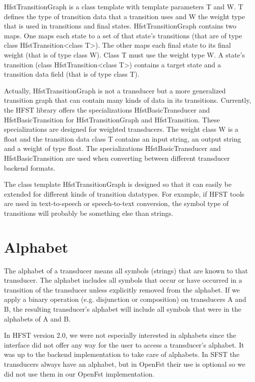 \documentclass{llncs}
\begin{document}
HfstTransitionGraph is a class template with template parameters T and
W. T defines the type of transition data that a transition uses and W
the weight type that is used in transitions and final states. 
HfstTransitionGraph contains two maps. One maps each state to a set of
that state's transitions (that are of type class HfstTransition\textless class
T\textgreater). The other maps each final state to its final weight 
(that is of type class W). Class T must use the weight type W. 
A state's transition (class HfstTransition\textless class T\textgreater) 
contains a target state and a transition data field (that is of type class T).

Actually, HfstTransitionGraph is not a transducer but a more
generalized transition graph that can contain many kinds of data in
its transitions. Currently, the HFST library offers the specializations 
HfstBasicTransducer and HfstBasicTransition for HfstTransitionGraph
and HfstTransition. These specializations are designed for weighted 
transducers. The weight class W is a float and the transition data
class T contains an input string, an output string and a weight of
type float. The specializations HfstBasicTransducer and
HfstBasicTransition are used when converting between different
transducer backend formats.

The class template HfstTransitionGraph is designed so that it can
easily be extended for different kinds of transition datatypes. For
example, if HFST tools are used in text-to-speech or speech-to-text
conversion, the symbol type of transitions will probably be something
else than strings.



\section{Alphabet}

The alphabet of a transducer means all symbols (strings) that are
known to that transducer. The alphabet includes all symbols that occur 
or have occurred in a transition of the transducer unless explicitly
removed from the alphabet. 
If we apply a binary operation (e.g. disjunction or composition) on 
transducers A and B, the resulting transducer's alphabet will include
all symbols that were in the alphabets of A and B. 

In HFST version 2.0, we were not especially interested in alphabets 
since the interface did not offer any way for the user to access a 
transducer's alphabet. It was up to the backend implementation to take
care of alphabets. In SFST the transducers always have an alphabet,
but in OpenFst their use is optional so we did not use them in our
OpenFst implementation.
\end{document}
